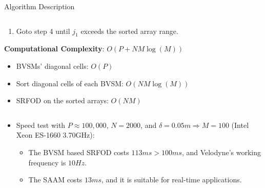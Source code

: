 \documentclass[final,hyperref={pdfpagelabels=false}]{beamer}
\begin{document}
\begin{frame}[t]
\begin{columns}[t]
\begin{column}{.48\textwidth}
\begin{block}{Algorithm Description}
\begin{columns}
\begin{column}{0.49\textwidth}
\begin{framed}
\begin{enumerate}
					\item Goto step 4 until $j_1$ exceeds the sorted array range.
				\end{enumerate}
				
				\textbf{Computational Complexity}: $O(P+NM\log(M))$
				\begin{itemize}
					\item BVSMs' diagonal cells: $O(P)$
					\item Sort diagonal cells of each BVSM: $O(NM\log(M))$
					\item SRFOD on the sorted arrays: $O(NM)$
				\end{itemize}
			\end{framed}
		\end{column}
\end{columns}

\begin{itemize}
	\item Speed test with $P\approx100,000$, $N=2000$, and $\delta=0.05m \Rightarrow M=100$ (Intel Xeon ES-1660 3.70GHz):
	\begin{itemize}
		\item The BVSM based SRFOD costs $113ms>100ms$, and Velodyne's working frequency is $10Hz$.
		\item The SAAM costs $13ms$, and it is suitable for real-time applications. 
	\end{itemize}
\end{itemize}


\end{block}


\end{column}
\end{columns}
\end{frame}
\end{document}
